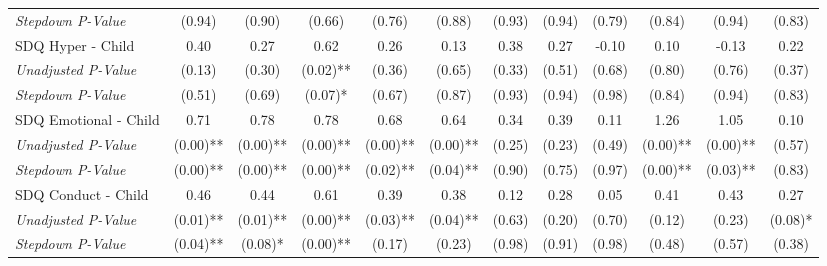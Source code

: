 \begin{tabular}{l c c c c c c c c c c c}
\quad \textit{Stepdown P-Value} & (0.94) & (0.90) & (0.66) & (0.76) & (0.88) & (0.93) & (0.94) & (0.79) & (0.84) & (0.94) & (0.83) \\
SDQ Hyper - Child & 0.40 & 0.27 & 0.62 & 0.26 & 0.13 & 0.38 & 0.27 & -0.10 & 0.10 & -0.13 & 0.22 \\
\quad \textit{Unadjusted P-Value} & (0.13) & (0.30) & (0.02)** & (0.36) & (0.65) & (0.33) & (0.51) & (0.68) & (0.80) & (0.76) & (0.37) \\
\quad \textit{Stepdown P-Value} & (0.51) & (0.69) & (0.07)* & (0.67) & (0.87) & (0.93) & (0.94) & (0.98) & (0.84) & (0.94) & (0.83) \\
SDQ Emotional - Child & 0.71 & 0.78 & 0.78 & 0.68 & 0.64 & 0.34 & 0.39 & 0.11 & 1.26 & 1.05 & 0.10 \\
\quad \textit{Unadjusted P-Value} & (0.00)** & (0.00)** & (0.00)** & (0.00)** & (0.00)** & (0.25) & (0.23) & (0.49) & (0.00)** & (0.00)** & (0.57) \\
\quad \textit{Stepdown P-Value} & (0.00)** & (0.00)** & (0.00)** & (0.02)** & (0.04)** & (0.90) & (0.75) & (0.97) & (0.00)** & (0.03)** & (0.83) \\
SDQ Conduct - Child & 0.46 & 0.44 & 0.61 & 0.39 & 0.38 & 0.12 & 0.28 & 0.05 & 0.41 & 0.43 & 0.27 \\
\quad \textit{Unadjusted P-Value} & (0.01)** & (0.01)** & (0.00)** & (0.03)** & (0.04)** & (0.63) & (0.20) & (0.70) & (0.12) & (0.23) & (0.08)* \\
\quad \textit{Stepdown P-Value} & (0.04)** & (0.08)* & (0.00)** & (0.17) & (0.23) & (0.98) & (0.91) & (0.98) & (0.48) & (0.57) & (0.38) \\
\bottomrule
\end{tabular}
